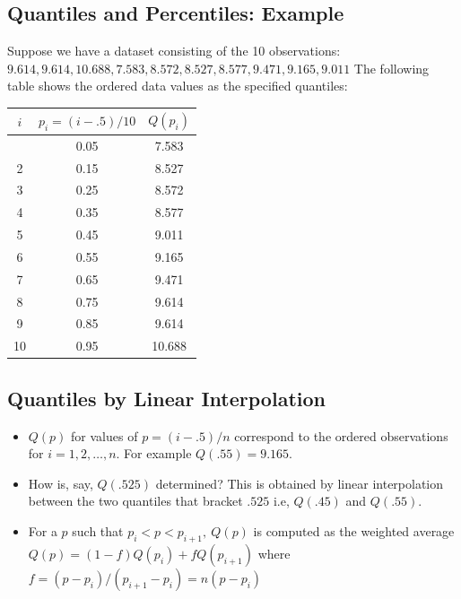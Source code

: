 \documentclass[
  letterpaper,
  DIV=11,
  numbers=noendperiod]{scrartcl}
\newcounter{none} %
\begin{document}
\subsection{Quantiles and Percentiles:
Example}\label{quantiles-and-percentiles-example}

Suppose we have a dataset consisting of the 10 observations:
\(9.614,  9.614,  10.688,  7.583,  8.572,  8.527,  8.577,  9.471,
9.165,  9.011\) The following table shows the ordered data values as the
specified {quantiles}:

{\def\LTcaptype{none} %
\begin{longtable}[]{@{}ccc@{}}
\toprule\noalign{}
\(i\) & \(p_i=(i-.5)/10\) & \(Q(p_i)\) \\
\midrule\noalign{}
\endhead
\bottomrule\noalign{}
\endlastfoot
1 & 0.05 & 7.583 \\
2 & 0.15 & 8.527 \\
3 & 0.25 & 8.572 \\
4 & 0.35 & 8.577 \\
5 & 0.45 & 9.011 \\
6 & 0.55 & 9.165 \\
7 & 0.65 & 9.471 \\
8 & 0.75 & 9.614 \\
9 & 0.85 & 9.614 \\
10 & 0.95 & 10.688 \\
\end{longtable}
}

\subsection{Quantiles by Linear
Interpolation}\label{quantiles-by-linear-interpolation}

\begin{itemize}
\item
  \(Q(p)\) for values of \(p = (i-.5)/n\) correspond to the ordered
  observations for \(i = 1, 2, \ldots, n\). For example
  \(Q(.55)=9.165\).
\item
  How is, say, \(Q(.525)\) determined? This is obtained by linear
  interpolation between the two quantiles that bracket \(.525\) i.e,
  \(Q(.45)\) and \(Q(.55)\).
\item
  For a \(p\) such that \(p_i < p < p_{i+1},\ Q(p)\) is computed as the
  weighted average \(Q(p) = (1-f)Q(p_i) + fQ(p_{i+1})\) where
  \(f =(p-p_i)/(p_{i+1}-p_i) = n(p-p_i)\)
\end{itemize}
\end{document}
